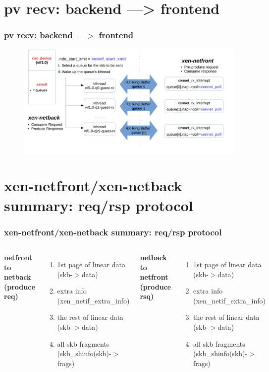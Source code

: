 \documentclass[aspectratio=169]{beamer}
\begin{document}

\section{pv recv: backend ---> frontend}
\begin{frame}
\frametitle{pv recv: backend ---$>$ frontend}
\begin{figure}
\includegraphics[width=1.0\linewidth]{figures/vif_to_eth.pdf}
\end{figure}
\end{frame}


\section{xen-netfront/xen-netback summary: req/rsp protocol}
\begin{frame}
\frametitle{xen-netfront/xen-netback summary: req/rsp protocol}
\begin{columns}[c]
\begin{center} \textbf{netfront to netback (produce req)} \end{center}
\begin{enumerate}
\item 1st page of linear data (skb-$>$data)
\item extra info (xen\_netif\_extra\_info)
\item the rest of linear data (skb-$>$data)
\item all skb fragments (skb\_shinfo(skb)-$>$frags)
\end{enumerate}
\begin{center} \textbf{netback to netfront (produce rsq)} \end{center}
\begin{enumerate}
\item 1st page of linear data (skb-$>$data)
\item extra info (xen\_netif\_extra\_info)
\item the rest of linear data (skb-$>$data) 
\item all skb fragments (skb\_shinfo(skb)-$>$frags)
\end{enumerate}
\end{columns}
\end{frame}
\end{document}
